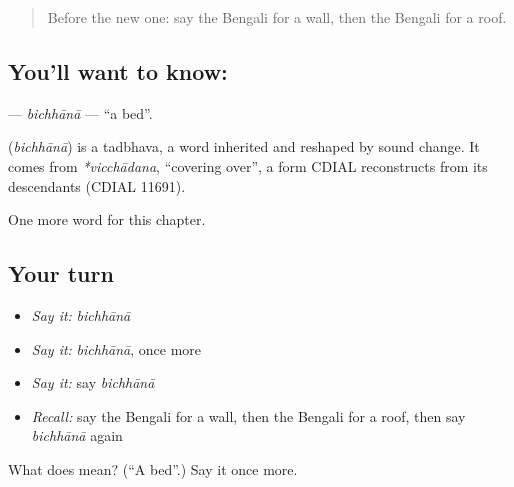\begin{quote}
Before the new one: say the Bengali for a wall, then the Bengali for a roof.
\end{quote}

\subsection*{You'll want to know: }
\textbf{} — \emph{bichhānā} — \textquotedblleft{}a bed\textquotedblright{}.

\begin{cousinweb}
\textbf{} (\emph{bichhānā}) is a tadbhava, a word inherited and reshaped by sound change. It comes from \emph{*vicchādana}, \textquotedblleft{}covering over\textquotedblright{}, a form CDIAL reconstructs from its descendants (CDIAL 11691).
\end{cousinweb}

\begin{grammarlens}[title={What you've built}]
One more word for this chapter.
\end{grammarlens}

\subsection*{Your turn}
\begin{itemize}
\raggedright
  \item \emph{Say it:} \emph{bichhānā}
  \item \emph{Say it:} \emph{bichhānā}, once more
  \item \emph{Say it:} say \emph{bichhānā}
  \item \emph{Recall:} say the Bengali for a wall, then the Bengali for a roof, then say \emph{bichhānā} again
\end{itemize}

\begin{tcolorbox}[breakable,colback=teal!4,colframe=teal!35!black,title={Before you move on}]
What does  mean? (\textquotedblleft{}A bed\textquotedblright{}.) Say it once more.
\end{tcolorbox}
